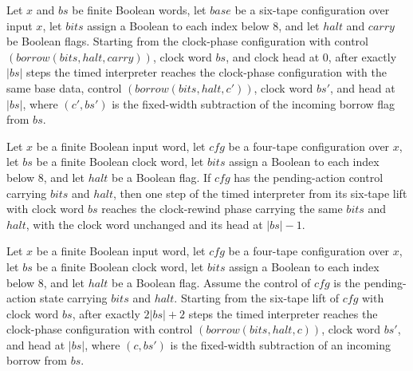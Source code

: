 \begin{lemma}
\label{Turing.timed_clock_borrow}
\leanok
{}
Let $x$ and $bs$ be finite Boolean words, let $base$ be a six-tape configuration over
input $x$, let $bits$ assign a Boolean to each index below $8$, and let $halt$ and
$carry$ be Boolean flags. Starting from the clock-phase configuration with control
$(borrow(bits,halt,carry))$, clock word $bs$, and clock head at $0$, after exactly
$|bs|$ steps the timed interpreter reaches the clock-phase configuration with the same
base data, control $(borrow(bits,halt,c'))$, clock word $bs'$, and head at $|bs|$, where
$(c',bs')$ is the fixed-width subtraction of the incoming borrow flag from $bs$.
\end{lemma}

\begin{lemma}
\label{Turing.timed_clock_start}
\leanok
{}
Let $x$ be a finite Boolean input word, let $cfg$ be a four-tape configuration over $x$,
let $bs$ be a finite Boolean clock word, let $bits$ assign a Boolean to each index below
$8$, and let $halt$ be a Boolean flag. If $cfg$ has the pending-action control carrying
$bits$ and $halt$, then one step of the timed interpreter from its six-tape lift with
clock word $bs$ reaches the clock-rewind phase carrying the same $bits$ and $halt$, with
the clock word unchanged and its head at $|bs|-1$.
\end{lemma}

\begin{lemma}
\label{Turing.timed_clock_pass}
\leanok
{}
Let $x$ be a finite Boolean input word, let $cfg$ be a four-tape configuration over $x$,
let $bs$ be a finite Boolean clock word, let $bits$ assign a Boolean to each index below
$8$, and let $halt$ be a Boolean flag. Assume the control of $cfg$ is the pending-action
state carrying $bits$ and $halt$. Starting from the six-tape lift of $cfg$ with clock
word $bs$, after exactly $2|bs|+2$ steps the timed interpreter reaches the clock-phase
configuration with control $(borrow(bits,halt,c))$, clock word $bs'$, and head at
$|bs|$, where $(c,bs')$ is the fixed-width subtraction of an incoming borrow from $bs$.
\end{lemma}

